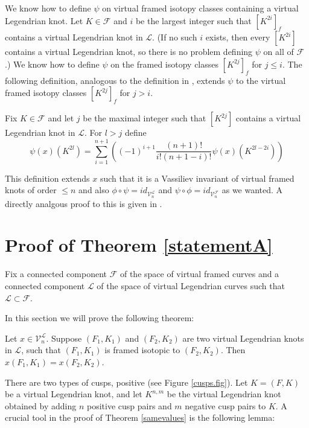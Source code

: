 We know how to define $\psi$ on virtual framed isotopy classes containing a virtual Legendrian knot. Let $K \in \mathcal{F}$ and $i$ be the largest integer such that $[K^{2i}]_f$ contains a virtual Legendrian knot in $\mathcal{L}$.  (If no such $i$ exists, then every $[K^{2i}]$ contains a virtual Legendrian knot, so there is no problem defining $\psi$ on all of $\mathcal{F}$.) We know how to define $\psi$ on the framed isotopy classes $[K^{2j}]_f$ for $j\leq i$.  The following definition, analogous to the definition in \cite{Chernov}, extends $\psi$ to the virtual framed isotopy classes $[K^{2j}]_f$ for $j>i$. 

\begin{defin}
Fix $K\in\mathcal{F}$ and let $j$ be the maximal integer such that $[K^{2j}]$ contains a virtual Legendrian knot in $\mathcal{L}$.  For $l>j$ define 
$$\psi(x)(K^{2l}) = \sum_{i=1}^{n+1}\left( (-1)^{i+1} \frac{(n+1)!}{i!(n+1-i)!}\psi(x)(K^{2l-2i}) \right)$$
\end{defin}

This definition extends $x$ such that it is a Vassiliev invariant of virtual framed knots of order $\leq n$ and also $\phi \circ \psi = id_{\mathcal{V}_n^\mathcal{L}}$  and $\psi \circ \phi = id_{\mathcal{V}_n^\mathcal{F}}$ as we wanted.  A directly analgous proof to this is given in \cite{Chernov}.


\section{Proof of Theorem \ref{statementA}}
Fix a connected component $\mathcal{F}$ of the space of virtual framed curves and a connected component $\mathcal{L}$ of the space of virtual Legendrian curves such that $\mathcal{L}\subset \mathcal{F}$.

In this section we will prove the following theorem:

\begin{thm} \label{samevalues}
Let $x\in \mathcal{V}_n^\mathcal{L}$.  Suppose $(F_1, K_1)$ and $(F_2, K_2)$ are two virtual Legendrian knots in $ \mathcal{L}$, such that $(F_1, K_1)$ is framed isotopic to $(F_2, K_2)$.   Then $x(F_1, K_1) = x(F_2, K_2)$.
\end{thm}

There are two types of cusps, positive (see Figure \ref{cusps.fig}).  Let $K=(F,K)$ be a virtual Legendrian knot, and let $K^{n,m}$ be the virtual Legendrian knot obtained by adding $n$ positive cusp pairs and $m$ negative cusp pairs to $K$.  A crucial tool in the proof of Theorem \ref{samevalues} is the following lemma:

